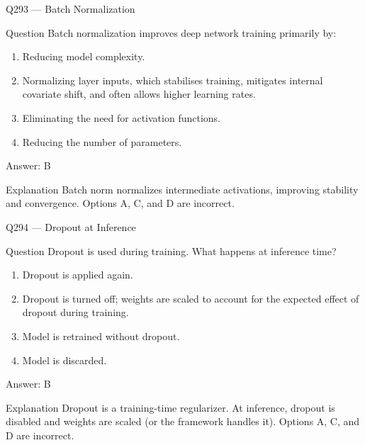 \documentclass[aspectratio=169,8pt]{beamer}
\begin{document}
\begin{frame}{Q293 --- Batch Normalization}
\begin{block}{Question}
Batch normalization improves deep network training primarily by:
\begin{enumerate}
\item Reducing model complexity.
\item Normalizing layer inputs, which stabilises training, mitigates internal covariate shift, and often allows higher learning rates.
\item Eliminating the need for activation functions.
\item Reducing the number of parameters.
\end{enumerate} \end{block}
\begin{exampleblock}{Answer: B}\end{exampleblock}
\begin{block}{Explanation}
Batch norm normalizes intermediate activations, improving stability and convergence. Options A, C, and D are incorrect.
\end{block}
\end{frame}

\begin{frame}{Q294 --- Dropout at Inference}
\begin{block}{Question}
Dropout is used during training. What happens at inference time?
\begin{enumerate}
\item Dropout is applied again.
\item Dropout is turned off; weights are scaled to account for the expected effect of dropout during training.
\item Model is retrained without dropout.
\item Model is discarded.
\end{enumerate}\end{block}
\begin{exampleblock}{Answer: B}\end{exampleblock}
\begin{block}{Explanation}
Dropout is a training-time regularizer. At inference, dropout is disabled and weights are scaled (or the framework handles it). Options A, C, and D are incorrect.
\end{block}
\end{frame}
\end{document}

